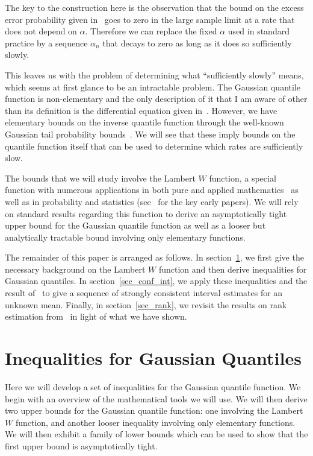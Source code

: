 \documentclass[12pt]{article}
\numberwithin{theorem}{section}
\begin{document}
The key to the construction here is the observation that the bound on the excess error probability given in~\cite{hall1995coverage} goes to zero in the large sample limit at a rate that does not depend on $\alpha$.  Therefore we can replace the fixed $\alpha$ used in standard practice by a sequence $\alpha_n$ that decays to zero as long as it does so sufficiently slowly.

This leaves us with the problem of determining what ``sufficiently slowly'' means, which seems at first glance to be an intractable problem.  The Gaussian quantile function is non-elementary and the only description of it that I am aware of other than its definition is the differential equation given in~\cite{steinbrecher2008quantileMech}.  However, we have elementary bounds on the inverse quantile function through the well-known Gaussian tail probability bounds~\citep{duembgen2010tailBounds}.  We will see that these imply bounds on the quantile function itself that can be used to determine which rates are sufficiently slow.

The bounds that we will study involve the Lambert $W$ function, a special function with numerous applications in both pure and applied mathematics~\citep{brito2008lambertToday, corless1996lambertW, dence2013briefLook} as well as in probability and statistics (see~\cite{goerg2011lambertVars, jodra2009quantiles, pakes2011mixtures, stehlik2003exactTests} for the key early papers).  We will rely on standard results regarding this function to derive an asymptotically tight upper bound for the Gaussian quantile function as well as a looser but analytically tractable bound involving only elementary functions.

The remainder of this paper is arranged as follows.  In section~\ref{sec_ineq}, we first give the necessary background on the Lambert $W$ function and then derive inequalities for Gaussian quantiles.  In section~\ref{sec_conf_int}, we apply these inequalities and the result of~\cite{hall1995coverage} to give a sequence of strongly consistent interval estimates for an unknown mean.  Finally, in section~\ref{sec_rank}, we revisit the results on rank estimation from~\cite{rising2023orderPersp} in light of what we have shown.

\section{Inequalities for Gaussian Quantiles}
\label{sec_ineq}

Here we will develop a set of inequalities for the Gaussian quantile function.  We begin with an overview of the mathematical tools we will use.  We will then derive two upper bounds for the Gaussian quantile function: one involving the Lambert $W$ function, and another looser inequality involving only elementary functions.  We will then exhibit a family of lower bounds which can be used to show that the first upper bound is asymptotically tight.
\end{document}
